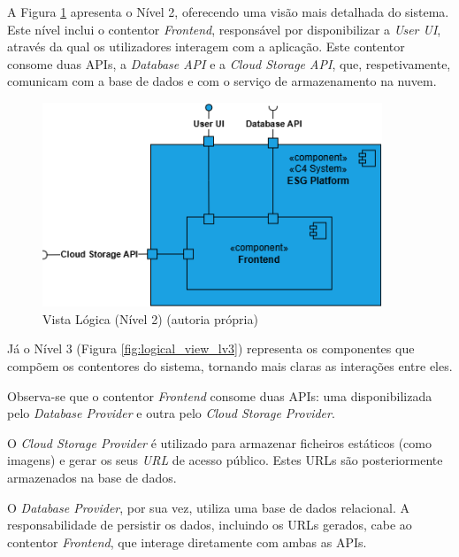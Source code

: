 A Figura \ref{fig:logical_view_lv2} apresenta o Nível 2, oferecendo uma visão mais detalhada do sistema. Este nível inclui o contentor \textit{Frontend}, responsável por disponibilizar a \textit{User \gls{UI}}, através da qual os utilizadores interagem com a aplicação. Este contentor consome duas APIs, a \textit{Database API} e a \textit{Cloud Storage API}, que, respetivamente, comunicam com a base de dados e com o serviço de armazenamento na nuvem.

\begin{figure}[H]
    \centering
    \includegraphics[width=4in,keepaspectratio]{frontmatter/assets/diagrams/Logical View/Logical View Lv2.drawio.png}
    \caption{Vista Lógica (Nível 2) (autoria própria)}
    \label{fig:logical_view_lv2}
\end{figure}

Já o Nível 3 (Figura \ref{fig:logical_view_lv3}) representa os componentes que compõem os contentores do sistema, tornando mais claras as interações entre eles.

Observa-se que o contentor \textit{Frontend} consome duas APIs: uma disponibilizada pelo \textit{Database Provider} e outra pelo \textit{Cloud Storage Provider}.

O \textit{Cloud Storage Provider} é utilizado para armazenar ficheiros estáticos (como imagens) e gerar os seus \textit{\gls{URL}} de acesso público. Estes URLs são posteriormente armazenados na base de dados.

O \textit{Database Provider}, por sua vez, utiliza uma base de dados relacional. A responsabilidade de persistir os dados, incluindo os URLs gerados, cabe ao contentor \textit{Frontend}, que interage diretamente com ambas as APIs.

